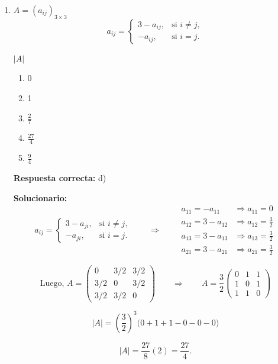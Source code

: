 \begin{enumerate}
	\vspace{6mm}
	
	\item {}$ A = (a_{ij})_{3\times3}$ 
	\[
	a_{ij} =
	\begin{cases}
		3 - a_{ij}, & \text{si } i \neq j,\\[4pt]
		-a_{ij},    & \text{si } i = j.
	\end{cases}
	\]
	
	 $|A|$
	
	
	\begin{enumerate}[label=\alph*)]
		\item 0
		\item 1
		\item $\frac{2}{7}$
		\item $\frac{27}{4}$
		\item $\frac{9}{4}$
	\end{enumerate}
	\textbf{Respuesta correcta:} d)
	
	\vspace{2mm}
	\textbf{Solucionario:}\\
	
	\[
	a_{ij} =
	\begin{cases}
		3 - a_{ji}, & \text{si } i \neq j,\\[6pt]
		-a_{ji},    & \text{si } i = j.
	\end{cases}
	\qquad\Rightarrow\qquad 
	\begin{aligned}
		a_{11} = -a_{11} &\Rightarrow a_{11} = 0 \\[6pt]
		a_{12} = 3 - a_{12} &\Rightarrow a_{12} = \frac{3}{2} \\[6pt]
		a_{13} = 3 - a_{13} &\Rightarrow a_{13} = \frac{3}{2} \\[6pt]
		a_{21} = 3 - a_{21} &\Rightarrow a_{21} = \frac{3}{2}
	\end{aligned}
	\]
	
	\[
	\text{Luego, } 
	A = 
	\begin{pmatrix}
		0 & 3/2 & 3/2 \\
		3/2 & 0 & 3/2 \\
		3/2 & 3/2 & 0
	\end{pmatrix}
	\qquad\Rightarrow\qquad 	
	A = \frac{3}{2}
	\begin{pmatrix}
		0 & 1 & 1 \\
		1 & 0 & 1 \\
		1 & 1 & 0
	\end{pmatrix}
	\]
	
	\[
	|A|
	= \left(\frac{3}{2}\right)^3 \bigl(0 + 1 + 1 - 0 - 0 - 0\bigr)
	\]
	
	\[
	|A| = \frac{27}{8}(2)
	= \frac{27}{4}.
	\]	
	
\end{enumerate}	


